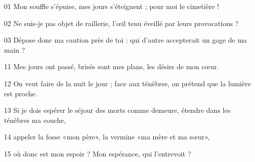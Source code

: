 01 Mon souffle s’épuise, mes jours s’éteignent ; pour moi le cimetière !

02 Ne suis-je pas objet de raillerie, l’œil tenu éveillé par leurs provocations ?

03 Dépose donc ma caution près de toi : qui d’autre accepterait un gage de ma main ?

11 Mes jours ont passé, brisés sont mes plans, les désirs de mon cœur.

12 On veut faire de la nuit le jour ; face aux ténèbres, on prétend que la lumière est proche.

13 Si je dois espérer le séjour des morts comme demeure, étendre dans les ténèbres ma couche,

14 appeler la fosse «mon père», la vermine «ma mère et ma sœur»,

15 où donc est mon espoir ? Mon espérance, qui l’entrevoit ?